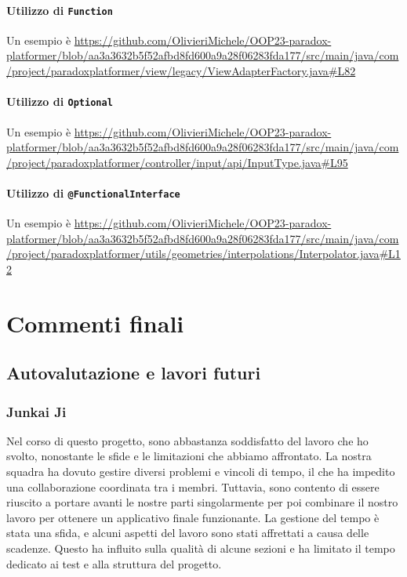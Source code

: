 \documentclass[a4paper,12pt]{report}
\begin{document}
\subsubsection{Utilizzo di \texttt{Function}}
Un esempio è
\url{https://github.com/OlivieriMichele/OOP23-paradox-platformer/blob/aa3a3632b5f52afbd8fd600a9a28f06283fda177/src/main/java/com/project/paradoxplatformer/view/legacy/ViewAdapterFactory.java#L82}

\subsubsection{Utilizzo di \texttt{Optional}}
Un esempio è
\url{https://github.com/OlivieriMichele/OOP23-paradox-platformer/blob/aa3a3632b5f52afbd8fd600a9a28f06283fda177/src/main/java/com/project/paradoxplatformer/controller/input/api/InputType.java#L95}

\subsubsection{Utilizzo di \texttt{@FunctionalInterface}}
Un esempio è
\url{https://github.com/OlivieriMichele/OOP23-paradox-platformer/blob/aa3a3632b5f52afbd8fd600a9a28f06283fda177/src/main/java/com/project/paradoxplatformer/utils/geometries/interpolations/Interpolator.java#L12}
	

\chapter{Commenti finali}

\section{Autovalutazione e lavori futuri}

\subsection{Junkai Ji}
Nel corso di questo progetto, sono abbastanza soddisfatto del lavoro che ho svolto, nonostante le sfide e le limitazioni che abbiamo affrontato. La nostra squadra ha dovuto gestire diversi problemi e vincoli di tempo, il che ha impedito una collaborazione coordinata tra i membri. Tuttavia, sono contento di essere riuscito a portare avanti le nostre parti singolarmente per poi combinare il nostro lavoro per ottenere un applicativo finale funzionante. La gestione del tempo è stata una sfida, e alcuni aspetti del lavoro sono stati affrettati a causa delle scadenze. Questo ha influito sulla qualità di alcune sezioni e ha limitato il tempo dedicato ai test e alla struttura del progetto.
\end{document}
